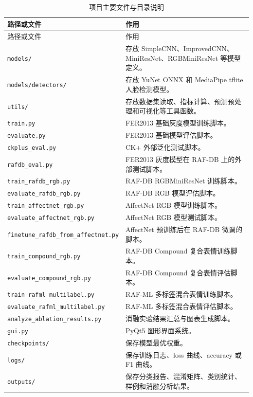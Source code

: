 \documentclass[UTF8,a4paper,12pt]{ctexart}
\newcommand{\code}[1]{\texttt{#1}}
\begin{document}
\small
\begin{longtable}{>{\raggedright\arraybackslash}p{}>{\raggedright\arraybackslash}p{}}
  \caption{项目主要文件与目录说明}\label{tab:project_structure}\\
  \toprule
  路径或文件 & 作用 \\
  \midrule
  \endfirsthead
  \toprule
  路径或文件 & 作用 \\
  \midrule
  \endhead
  \code{models/} & 存放 SimpleCNN、ImprovedCNN、MiniResNet、RGBMiniResNet 等模型定义。\\
  \code{models/detectors/} & 存放 YuNet ONNX 和 MediaPipe tflite 人脸检测模型。\\
  \code{utils/} & 存放数据集读取、指标计算、预测预处理和可视化等工具函数。\\
  \code{train.py} & FER2013 基础灰度模型训练脚本。\\
  \code{evaluate.py} & FER2013 基础模型评估脚本。\\
  \code{ckplus\_eval.py} & CK+ 外部泛化测试脚本。\\
  \code{rafdb\_eval.py} & FER2013 灰度模型在 RAF-DB 上的外部测试脚本。\\
  \code{train\_rafdb\_rgb.py} & RAF-DB RGBMiniResNet 训练脚本。\\
  \code{evaluate\_rafdb\_rgb.py} & RAF-DB RGB 模型评估脚本。\\
  \code{train\_affectnet\_rgb.py} & AffectNet RGB 模型训练脚本。\\
  \code{evaluate\_affectnet\_rgb.py} & AffectNet RGB 模型测试脚本。\\
  \code{finetune\_rafdb\_from\_affectnet.py} & AffectNet 预训练后在 RAF-DB 微调的脚本。\\
  \code{train\_compound\_rgb.py} & RAF-DB Compound 复合表情训练脚本。\\
  \code{evaluate\_compound\_rgb.py} & RAF-DB Compound 复合表情评估脚本。\\
  \code{train\_rafml\_multilabel.py} & RAF-ML 多标签混合表情训练脚本。\\
  \code{evaluate\_rafml\_multilabel.py} & RAF-ML 多标签混合表情评估脚本。\\
  \code{analyze\_ablation\_results.py} & 消融实验结果汇总与图表生成脚本。\\
  \code{gui.py} & PyQt5 图形界面系统。\\
  \code{checkpoints/} & 保存模型最优权重。\\
  \code{logs/} & 保存训练日志、loss 曲线、accuracy 或 F1 曲线。\\
  \code{outputs/} & 保存分类报告、混淆矩阵、类别统计、样例和消融分析结果。\\
  \bottomrule
\end{longtable}
\normalsize
\end{document}
